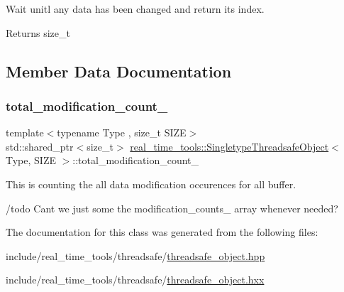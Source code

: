 Wait unitl any data has been changed and return its index. 

\begin{DoxyReturn}{Returns}
size\+\_\+t 
\end{DoxyReturn}


\subsection{Member Data Documentation}
\mbox{\label{classreal__time__tools_1_1SingletypeThreadsafeObject_a3475e1d35b7af07acdbf74c0170ed45d}} 
\subsubsection{\texorpdfstring{total\+\_\+modification\+\_\+count\+\_\+}{total\_modification\_count\_}}
{\footnotesize\ttfamily template$<$typename Type , size\+\_\+t S\+I\+ZE$>$ \\
std\+::shared\+\_\+ptr$<$size\+\_\+t$>$ \hyperlink{classreal__time__tools_1_1SingletypeThreadsafeObject}{real\+\_\+time\+\_\+tools\+::\+Singletype\+Threadsafe\+Object}$<$ Type, S\+I\+ZE $>$\+::total\+\_\+modification\+\_\+count\+\_\+\hspace{0.3cm}{\ttfamily [private]}}



This is counting the all data modification occurences for all buffer. 

/todo Can\textquotesingle{}t we just some the modification\+\_\+counts\+\_\+ array whenever needed? 

The documentation for this class was generated from the following files\+:\begin{DoxyCompactItemize}
\item 
include/real\+\_\+time\+\_\+tools/threadsafe/\hyperlink{threadsafe__object_8hpp}{threadsafe\+\_\+object.\+hpp}\item 
include/real\+\_\+time\+\_\+tools/threadsafe/\hyperlink{threadsafe__object_8hxx}{threadsafe\+\_\+object.\+hxx}\end{DoxyCompactItemize}
